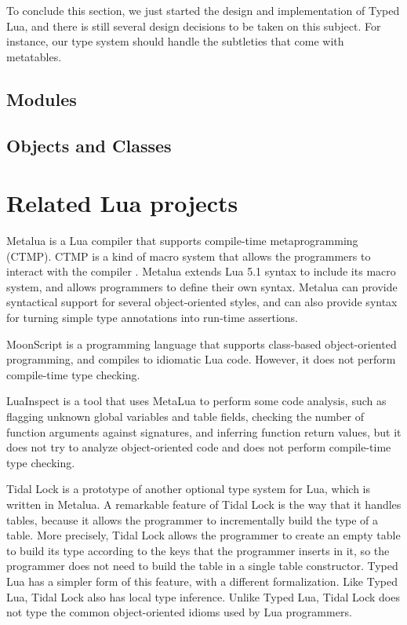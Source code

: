 To conclude this section, we just started the design and
implementation of Typed Lua, and there is still several design
decisions to be taken on this subject.
For instance, our type system should handle the subtleties that
come with metatables.

\subsection{Modules}

\subsection{Objects and Classes}

\section{Related Lua projects}

Metalua \citep{metalua} is a Lua compiler that supports compile-time
metaprogramming (CTMP).
CTMP is a kind of macro system that allows the programmers to interact
with the compiler \citep{fleutot2007contrasting}. 
Metalua extends Lua 5.1 syntax to include its macro system,
and allows programmers to define their own syntax.
Metalua can provide syntactical support for several object-oriented
styles, and can also provide syntax for turning simple type
annotations into run-time assertions.

MoonScript \citep{moonscript} is a programming language that supports
class-based object-oriented programming, and compiles to idiomatic
Lua code.
However, it does not perform compile-time type checking.

LuaInspect \citep{luainspect} is a tool that uses MetaLua to perform
some code analysis, such as flagging unknown global variables and
table fields, checking the number of function arguments against
signatures, and inferring function return values, but it does not
try to analyze object-oriented code and does not perform compile-time
type checking.

Tidal Lock \citep{tidallock} is a prototype of another optional type
system for Lua, which is written in Metalua.
A remarkable feature of Tidal Lock is the way that it handles tables,
because it allows the programmer to incrementally build the type of
a table.
More precisely, Tidal Lock allows the programmer to create an empty
table to build its type according to the keys that the programmer
inserts in it, so the programmer does not need to build the table in
a single table constructor.
Typed Lua has a simpler form of this feature, with a different
formalization.
Like Typed Lua, Tidal Lock also has local type inference.
Unlike Typed Lua, Tidal Lock does not type the common object-oriented
idioms used by Lua programmers.

